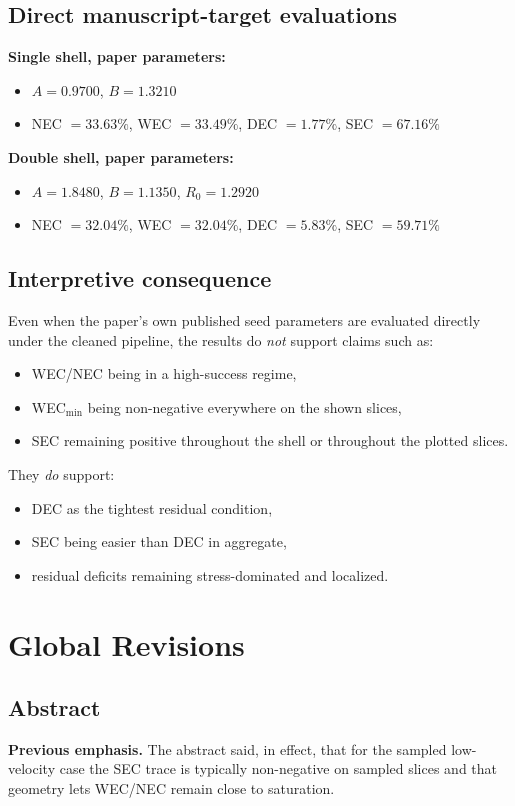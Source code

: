 \documentclass[11pt]{article}
\begin{document}
\subsection*{Direct manuscript-target evaluations}
\textbf{Single shell, paper parameters:}
\begin{itemize}[leftmargin=*]
\item $A = 0.9700$, $B = 1.3210$
\item NEC $= 33.63\%$, WEC $= 33.49\%$, DEC $= 1.77\%$, SEC $= 67.16\%$
\end{itemize}

\textbf{Double shell, paper parameters:}
\begin{itemize}[leftmargin=*]
\item $A = 1.8480$, $B = 1.1350$, $R_0 = 1.2920$
\item NEC $= 32.04\%$, WEC $= 32.04\%$, DEC $= 5.83\%$, SEC $= 59.71\%$
\end{itemize}

\subsection*{Interpretive consequence}
Even when the paper's own published seed parameters are evaluated directly under the cleaned
pipeline, the results do \emph{not} support claims such as:
\begin{itemize}[leftmargin=*]
\item WEC/NEC being in a high-success regime,
\item WEC$_{\min}$ being non-negative everywhere on the shown slices,
\item SEC remaining positive throughout the shell or throughout the plotted slices.
\end{itemize}

They \emph{do} support:
\begin{itemize}[leftmargin=*]
\item DEC as the tightest residual condition,
\item SEC being easier than DEC in aggregate,
\item residual deficits remaining stress-dominated and localized.
\end{itemize}

\section*{Global Revisions}
\subsection*{Abstract}
\textbf{Previous emphasis.}
The abstract said, in effect, that for the sampled low-velocity case the SEC trace is typically
non-negative on sampled slices and that geometry lets WEC/NEC remain close to saturation.
\end{document}
